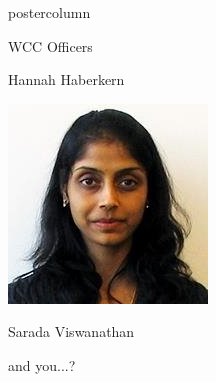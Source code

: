 \documentclass{beamer}
\begin{document}
\begin{frame}
\begin{columns}
\begin{column}{.33\textwidth}
\begin{beamercolorbox}[center,wd=\textwidth]{postercolumn}
\begin{minipage}[T]{.95\textwidth}
{\begin{myblock}{WCC Officers}
\begin{addmargin}[1em]{1em}
\begin{minipage}{0.3\linewidth}
                                \centerline{Hannah Haberkern}
                            \end{minipage}
                            \hspace{0.1cm}
                            \begin{minipage}{0.3\linewidth}
                                \includegraphics[width=\linewidth]{img/sarada.jpg}
                                \centerline{Sarada Viswanathan}
                            \end{minipage}
                            \begin{addmargin}[.5em]{.5em}
                                \vspace{.75cm}
                                \centerline{and you...?} 
                                \end{addmargin}
                            \end{addmargin}


\end{myblock}}
\end{minipage}
\end{beamercolorbox}
\end{column}
\end{columns}
\end{frame}
\end{document}
